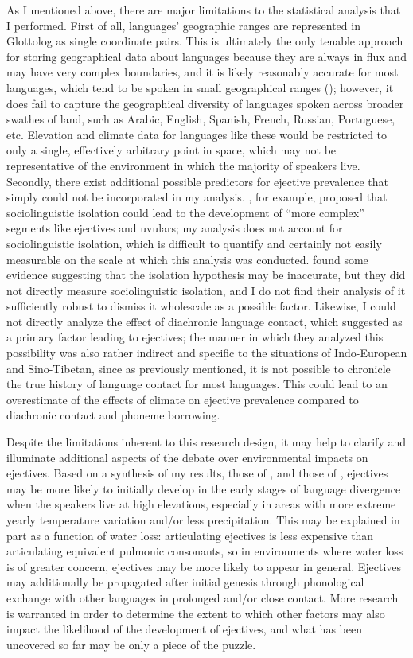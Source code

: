 \documentclass{article}
\begin{document}
As I mentioned above, there are major limitations to the statistical analysis that I performed. First of all, languages' geographic ranges are represented in Glottolog as single coordinate pairs. This is ultimately the only tenable approach for storing geographical data about languages because they are always in flux and may have very complex boundaries, and it is likely reasonably accurate for most languages, which tend to be spoken in small geographical ranges (\cite{hua2019}); however, it does fail to capture the geographical diversity of languages spoken across broader swathes of land, such as Arabic, English, Spanish, French, Russian, Portuguese, etc. Elevation and climate data for languages like these would be restricted to only a single, effectively arbitrary point in space, which may not be representative of the environment in which the majority of speakers live. Secondly, there exist additional possible predictors for ejective prevalence that simply could not be incorporated in my analysis. \textcite{nichols2014}, for example, proposed that sociolinguistic isolation could lead to the development of ``more complex'' segments like ejectives and uvulars; my analysis does not account for sociolinguistic isolation, which is difficult to quantify and certainly not easily measurable on the scale at which this analysis was conducted. \textcite{urban2021} found some evidence suggesting that the isolation hypothesis may be inaccurate, but they did not directly measure sociolinguistic isolation, and I do not find their analysis of it sufficiently robust to dismiss it wholescale as a possible factor. Likewise, I could not directly analyze the effect of diachronic language contact, which \textcite{urban2021} suggested as a primary factor leading to ejectives; the manner in which they analyzed this possibility was also rather indirect and specific to the situations of Indo-European and Sino-Tibetan, since as previously mentioned, it is not possible to chronicle the true history of language contact for most languages. This could lead to an overestimate of the effects of climate on ejective prevalence compared to diachronic contact and phoneme borrowing. 

Despite the limitations inherent to this research design, it may help to clarify and illuminate additional aspects of the debate over environmental impacts on ejectives. Based on a synthesis of my results, those of \textcite{everett2013}, and those of \textcite{urban2021}, ejectives may be more likely to initially develop in the early stages of language divergence when the speakers live at high elevations, especially in areas with more extreme yearly temperature variation and/or less precipitation. This may be explained in part as a function of water loss: articulating ejectives is less expensive than articulating equivalent pulmonic consonants, so in environments where water loss is of greater concern, ejectives may be more likely to appear in general. Ejectives may additionally be propagated after initial genesis through phonological exchange with other languages in prolonged and/or close contact. More research is warranted in order to determine the extent to which other factors may also impact the likelihood of the development of ejectives, and what has been uncovered so far may be only a piece of the puzzle.
\end{document}
